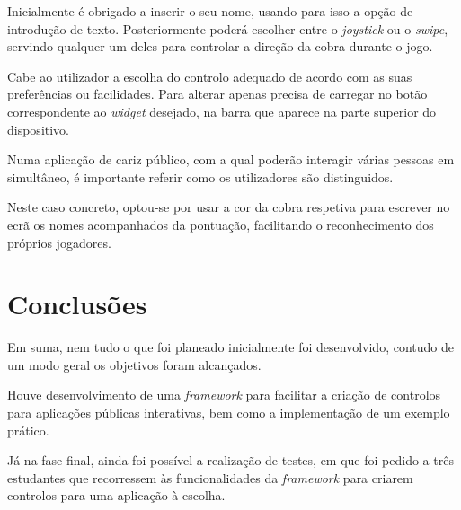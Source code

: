 \documentclass[9pt,a4paper]{extarticle}
\begin{document}
\begin{multicols}{2}
Inicialmente é obrigado a inserir o seu nome, usando para isso a opção de introdução de texto. Posteriormente poderá escolher entre o \textit{joystick} ou o \textit{swipe}, servindo qualquer um deles para controlar a direção da cobra durante o jogo. 

Cabe ao utilizador a escolha do controlo adequado de acordo com as suas preferências ou facilidades. Para alterar apenas precisa de carregar no botão correspondente ao \textit{widget} desejado, na barra que aparece na parte superior do dispositivo.

Numa aplicação de cariz público, com a qual poderão interagir várias pessoas em simultâneo, é importante referir como os utilizadores são distinguidos.

Neste caso concreto, optou-se por usar a cor da cobra respetiva para escrever no ecrã os nomes acompanhados da pontuação, facilitando o reconhecimento dos próprios jogadores.

\section{Conclusões}\label{sec:conclui}

Em suma, nem tudo o que foi planeado inicialmente foi desenvolvido, contudo de um modo geral os objetivos foram alcançados. 

Houve desenvolvimento de uma \textit{framework} para facilitar a criação de controlos para aplicações públicas interativas, bem como a implementação de um exemplo prático.

Já na fase final, ainda foi possível a realização de testes, em que foi pedido a três estudantes que recorressem às funcionalidades da \textit{framework} para criarem controlos para uma aplicação à escolha. 

%

\end{multicols}
\end{document}
